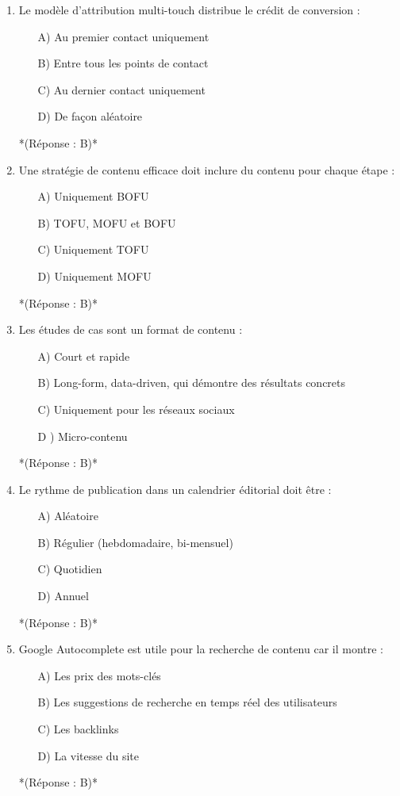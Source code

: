 \documentclass[12pt,a4paper,twoside]{report}
\begin{document}
\begin{enumerate}
\item Le modèle d'attribution multi-touch distribue le crédit de conversion :
\begin{itemize}
\item[A)] Au premier contact uniquement
\item[B)] Entre tous les points de contact
\item[C)] Au dernier contact uniquement
\item[D)] De façon aléatoire
\end{itemize}
*(Réponse : B)*

\item Une stratégie de contenu efficace doit inclure du contenu pour chaque étape :
\begin{itemize}
\item[A)] Uniquement BOFU
\item[B)] TOFU, MOFU et BOFU
\item[C)] Uniquement TOFU
\item[D)] Uniquement MOFU
\end{itemize}
*(Réponse : B)*

\item Les études de cas sont un format de contenu :
\begin{itemize}
\item[A)] Court et rapide
\item[B)] Long-form, data-driven, qui démontre des résultats concrets
\item[C)] Uniquement pour les réseaux sociaux
\item[D]) Micro-contenu
\end{itemize}
*(Réponse : B)*

\item Le rythme de publication dans un calendrier éditorial doit être :
\begin{itemize}
\item[A)] Aléatoire
\item[B)] Régulier (hebdomadaire, bi-mensuel)
\item[C)] Quotidien
\item[D)] Annuel
\end{itemize}
*(Réponse : B)*

\item Google Autocomplete est utile pour la recherche de contenu car il montre :
\begin{itemize}
\item[A)] Les prix des mots-clés
\item[B)] Les suggestions de recherche en temps réel des utilisateurs
\item[C)] Les backlinks
\item[D)] La vitesse du site
\end{itemize}
*(Réponse : B)*


\end{enumerate}
\end{document}
